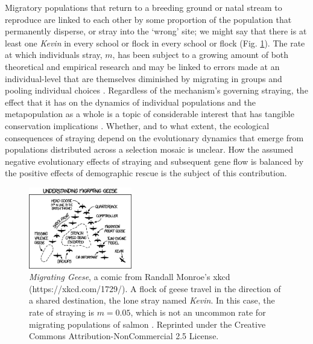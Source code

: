 \documentclass[twocolumn,preprintnumbers,amsmath,amssymb,superscriptaddress]{revtex4}
\begin{document}
Migratory populations that return to a breeding ground or natal stream to reproduce are linked to each other by some proportion of the population that permanently disperse, or stray into the `wrong' site; we might say that there is at least one \emph{Kevin} in every school or flock in every school or flock (Fig. \ref{fig:xkcd}).
The rate at which individuals stray, $m$, has been subject to a growing amount of both theoretical and empirical research \cite{H:2013fs,Keefer:2014gg,Bett:2017ha} and may be linked to errors made at an individual-level that are themselves diminished by migrating in groups and pooling individual choices \cite{Berdahl:2015kv,Berdahl:2016dx}.
Regardless of the mechanism's governing straying, the effect that it has on the dynamics of individual populations and the metapopulation as a whole is a topic of considerable interest that has tangible conservation implications \cite{Brenner:2012gl,Johnson:2012fe,Fullerton:2011ii}.
Whether, and to what extent, the ecological consequences of straying depend on the evolutionary dynamics that emerge from populations distributed across a selection mosaic is unclear.
How the assumed negative evolutionary effects of straying and subsequent gene flow is balanced by the positive effects of demographic rescue is the subject of this contribution.


\begin{figure}
  \captionsetup{justification=raggedright,
singlelinecheck=false
}
\centering
\includegraphics[width=0.4\textwidth]{figs2/fig_xkcd.png}
\caption{
\emph{Migrating Geese}, a comic from Randall Monroe's xkcd (https://xkcd.com/1729/). 
A flock of geese travel in the direction of a shared destination, the lone stray named \emph{Kevin}.
In this case, the rate of straying is $m=0.05$, which is not an uncommon rate for migrating populations of salmon \cite{Satterthwaite:2015ge}. 
Reprinted under the Creative Commons Attribution-NonCommercial 2.5 License.
} \label{fig:xkcd}
\end{figure}
\end{document}
